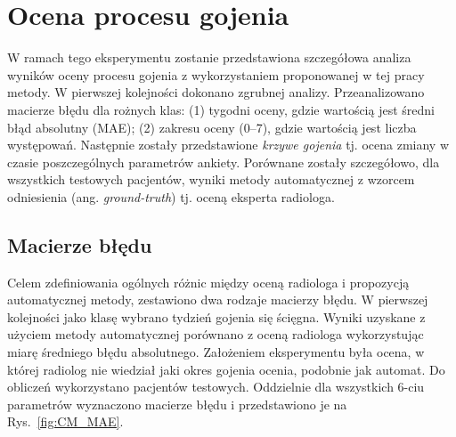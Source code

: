 \section{Ocena procesu gojenia}
\label{seq:valuation}
W ramach tego eksperymentu zostanie przedstawiona szczegółowa analiza wyników oceny procesu gojenia z wykorzystaniem proponowanej w tej pracy metody. \linebreak W pierwszej kolejności dokonano zgrubnej analizy. Przeanalizowano macierze błędu dla rożnych klas: (1) tygodni oceny, gdzie wartością jest średni błąd absolutny (MAE); (2) zakresu oceny (0--7), gdzie wartością jest liczba występowań. Następnie zostały przedstawione \textit{krzywe gojenia} tj. ocena zmiany w czasie poszczególnych parametrów ankiety. Porównane zostały szczegółowo, dla wszystkich testowych pacjentów, wyniki metody automatycznej z wzorcem odniesienia (ang. \textit{ground-truth}) tj. oceną eksperta radiologa.

\subsection{Macierze błędu}

Celem zdefiniowania ogólnych różnic między oceną radiologa i propozycją automatycznej metody, zestawiono dwa rodzaje macierzy błędu. W pierwszej kolejności jako klasę wybrano tydzień gojenia się ścięgna. Wyniki uzyskane z użyciem metody automatycznej porównano z oceną radiologa wykorzystując miarę średniego błędu absolutnego. Założeniem eksperymentu była ocena, w której radiolog nie wiedział jaki okres gojenia ocenia, podobnie jak automat. Do obliczeń wykorzystano pacjentów testowych. Oddzielnie dla wszystkich 6-ciu parametrów wyznaczono macierze błędu i przedstawiono je na Rys.~\ref{fig:CM_MAE}. 

